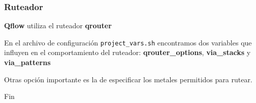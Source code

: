 \documentclass{beamer}
\begin{document}
\begin{frame}[fragile]
  \frametitle{Ruteador}
  \textbf{Qflow} utiliza el ruteador \textbf{qrouter}

  En el archivo de configuración \verb#project_vars.sh# encontramos dos variables que influyen en el comportamiento del ruteador: \textbf{qrouter\_options}, \textbf{via\_stacks} y \textbf{via\_patterns}

  Otras opción importante es la de especificar los metales permitidos para rutear.
\end{frame}


\begin{frame}
\Huge{\centerline{Fin}}
\end{frame}

\end{document}
